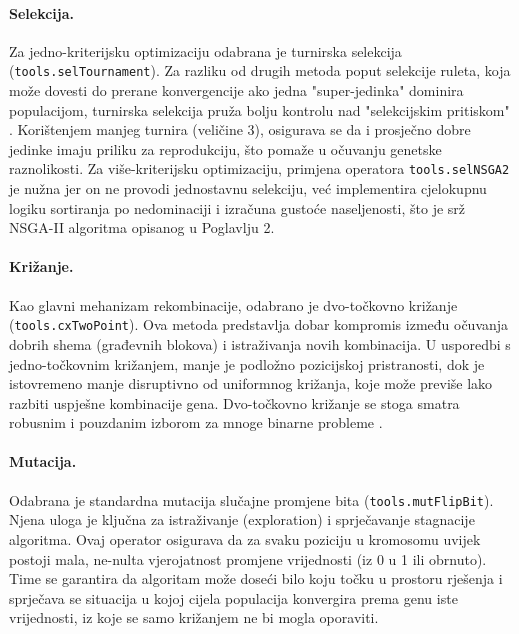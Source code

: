 \paragraph{Selekcija.}
Za jedno-kriterijsku optimizaciju odabrana je turnirska selekcija (\texttt{tools.selTournament}). Za razliku od drugih metoda poput selekcije ruleta, koja može dovesti do prerane konvergencije ako jedna "super-jedinka" dominira populacijom, turnirska selekcija pruža bolju kontrolu nad "selekcijskim pritiskom" \cite{Goldberg1989}. Korištenjem manjeg turnira (veličine 3), osigurava se da i prosječno dobre jedinke imaju priliku za reprodukciju, što pomaže u očuvanju genetske raznolikosti. Za više-kriterijsku optimizaciju, primjena operatora \texttt{tools.selNSGA2} je nužna jer on ne provodi jednostavnu selekciju, već implementira cjelokupnu logiku sortiranja po nedominaciji i izračuna gustoće naseljenosti, što je srž NSGA-II algoritma opisanog u Poglavlju 2.

\paragraph{Križanje.}
Kao glavni mehanizam rekombinacije, odabrano je dvo-točkovno križanje (\texttt{tools.cxTwoPoint}). Ova metoda predstavlja dobar kompromis između očuvanja dobrih shema (građevnih blokova) i istraživanja novih kombinacija. U usporedbi s jedno-točkovnim križanjem, manje je podložno pozicijskoj pristranosti, dok je istovremeno manje disruptivno od uniformnog križanja, koje može previše lako razbiti uspješne kombinacije gena. Dvo-točkovno križanje se stoga smatra robusnim i pouzdanim izborom za mnoge binarne probleme \cite{Mitchell1998}.

\paragraph{Mutacija.}
Odabrana je standardna mutacija slučajne promjene bita (\texttt{tools.mutFlipBit}). Njena uloga je ključna za istraživanje (exploration) i sprječavanje stagnacije algoritma. Ovaj operator osigurava da za svaku poziciju u kromosomu uvijek postoji mala, ne-nulta vjerojatnost promjene vrijednosti (iz 0 u 1 ili obrnuto). Time se garantira da algoritam može doseći bilo koju točku u prostoru rješenja i sprječava se situacija u kojoj cijela populacija konvergira prema genu iste vrijednosti, iz koje se samo križanjem ne bi mogla oporaviti.

